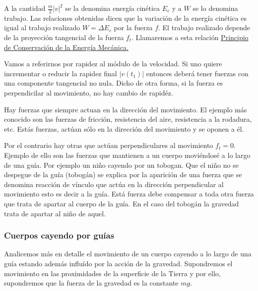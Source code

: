 \documentclass{article}
\renewcommand{\emph}[1]{\textcolor[rgb]{1,0,0}{#1}}
\newcounter{ejemplo_cont}
\begin{document}
  A la cantidad $\frac{m}{2}|v|^2$ se la denomina \emph{energía cinética} $E_c$ y a $W$ se lo denomina \emph{trabajo}.
Las relaciones obtenidas dicen que la variación de la energía cinética es igual al trabajo realizado $W=\Delta E_c$ por la fuerza $f$.
El trabajo realizado depende de la proyección tangencial de la fuerza $f_t$.  Llamaremos a esta relación
\href{https://es.wikipedia.org/wiki/Conservaci%C3%B3n_de_la_energ%C3%ADa}{Principio de Conservación de la Energía Mecánica.}

  Vamos a referirnos por \emph{rapidez} al módulo de la velocidad.
Si uno quiere incrementar o reducir la rapidez final $|v(t_1)|$ entonces deberá tener fuerzas con una componente tangencial no nula. 
Dicho de otra forma, si la fuerza es perpendicilar al movimiento, no hay cambio de rapidéz. 

  Hay fuerzas que siempre actuan en la dirección del movimiento. El ejemplo más conocido son las fuerzas de fricción, resistencia del aire,
resistencia a la rodadura, etc. Estás fuerzas, actúan sólo en la dirección del movimiento y se oponen a él.


 

  Por el contrario hay otras que actúan perpendiculares al movimiento $f_t=0$. Ejemplo de ello son las fuerzas que mantienen a un cuerpo moviéndosé a lo largo
de una guía. Por ejemplo un niño cayendo por un tobogan. Que el niño no se despegue de la guía (tobogán) se explica por la aparición de una fuerza que se denomina
reacción de vínculo que actúa en la dirección perpendicular al movimiento esto es decir a la guía. Está fuerza debe compensar a toda otra fuerza que trata de apartar
al cuerpo de la guía.  En el caso del tobogán la gravedad trata de apartar al niño de aquel.





\subsubsection{Cuerpos cayendo por guías}
Analicemos más en detalle el movimiento de un cuerpo cayendo a lo largo de una guía estando además influído  por la acción de la gravedad. Supondremos el movimiento en las proximidades de la superficie de la Tierra y por ello, supondremos que la fuerza de la gravedad es la constante $mg$. 
\end{document}
